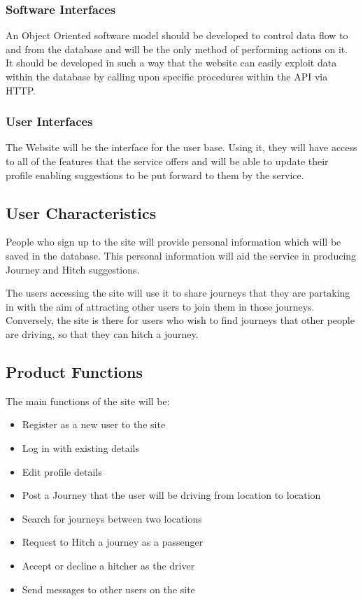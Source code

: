 \documentclass[11pt]{article}
\begin{document}
\subsubsection{Software Interfaces}
An Object Oriented software model should be developed to control data flow to and from the database and will be the only method of performing actions on it. It should be developed in such a way that the website can easily exploit data within the database by calling upon specific procedures within the API via HTTP.

\subsubsection{User Interfaces}
The Website will be the interface for the user base. Using it, they will have access to all of the features that the service offers and will be able to update their profile enabling suggestions to be put forward to them by the service.

\subsection{User Characteristics}
People who sign up to the site will provide personal information which will be saved in the database. This personal information will aid the service in producing Journey and Hitch suggestions. 

The users accessing the site will use it to share journeys that they are partaking in with the aim of attracting other users to join them in those journeys. Conversely, the site is there for users who wish to find journeys that other people are driving, so that they can hitch a journey.

\subsection{Product Functions}
The main functions of the site will be:
\begin{itemize}
\item Register as a new user to the site
\item Log in with existing details
\item Edit profile details
\item Post a Journey that the user will be driving from location to location
\item Search for journeys between two locations
\item Request to Hitch a journey as a passenger
\item Accept or decline a hitcher as the driver
\item Send messages to other users on the site
\end{itemize}
\end{document}
